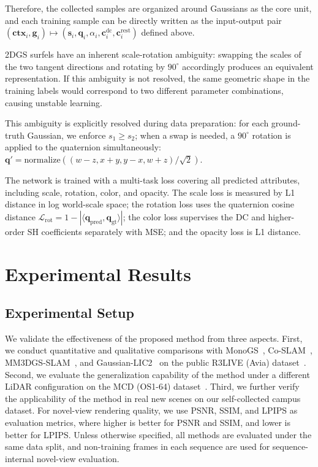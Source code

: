 \documentclass[lettersize,journal]{IEEEtran}
\begin{document}
Therefore, the collected samples are organized around Gaussians as the core unit, and each training sample can be directly written as the input-output pair $(\mathbf{ctx}_i, \mathbf{g}_i) \mapsto (\mathbf{s}_i, \mathbf{q}_i, \alpha_i, \mathbf{c}_i^{\mathrm{dc}}, \mathbf{c}_i^{\mathrm{rest}})$ defined above.

 2DGS surfels have an inherent scale-rotation ambiguity: swapping the scales of the two tangent directions and rotating by $90^\circ$ accordingly produces an equivalent representation. If this ambiguity is not resolved, the same geometric shape in the training labels would correspond to two different parameter combinations, causing unstable learning.

This ambiguity is explicitly resolved during data preparation: for each ground-truth Gaussian, we enforce $s_1 \geq s_2$; when a swap is needed, a $90^\circ$ rotation is applied to the quaternion simultaneously: $\mathbf{q}' = \text{normalize}((w-z, x+y, y-x, w+z) / \sqrt{2})$.

 The network is trained with a multi-task loss covering all predicted attributes, including scale, rotation, color, and opacity. The scale loss is measured by L1 distance in log world-scale space; the rotation loss uses the quaternion cosine distance $\mathcal{L}_{\text{rot}} = 1 - |\langle \mathbf{q}_{\text{pred}}, \mathbf{q}_{\text{gt}} \rangle|$; the color loss supervises the DC and higher-order SH coefficients separately with MSE; and the opacity loss is L1 distance.

\section{Experimental Results}

\subsection{Experimental Setup}
We validate the effectiveness of the proposed method from three aspects. First, we conduct quantitative and qualitative comparisons with MonoGS~\cite{matsuki2024gaussian}, Co-SLAM~\cite{wang2023co}, MM3DGS-SLAM~\cite{sun2024mm3dgs}, and Gaussian-LIC2~\cite{lang2025gaussianlic2} on the public R3LIVE (Avia) dataset~\cite{lin2022r}. Second, we evaluate the generalization capability of the method under a different LiDAR configuration on the MCD (OS1-64) dataset~\cite{nguyen2024mcd}. Third, we further verify the applicability of the method in real new scenes on our self-collected campus dataset. For novel-view rendering quality, we use PSNR, SSIM, and LPIPS as evaluation metrics, where higher is better for PSNR and SSIM, and lower is better for LPIPS. Unless otherwise specified, all methods are evaluated under the same data split, and non-training frames in each sequence are used for sequence-internal novel-view evaluation.
\end{document}
